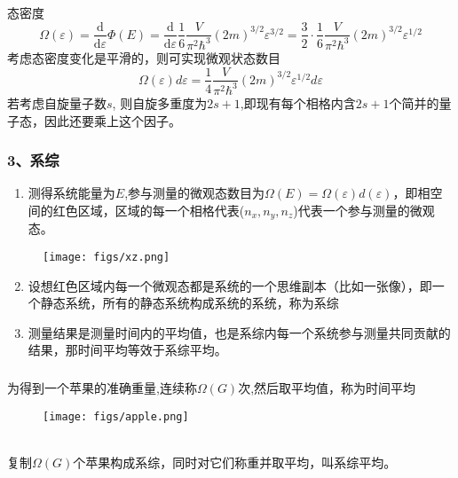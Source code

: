  \begin{frame}
   \frametitle{}
  态密度
  \[  \Omega(\varepsilon) =\frac{\mathrm{d}  }{\mathrm{d}\varepsilon}\Phi(E) = \frac{\mathrm{d}  }{\mathrm{d}\varepsilon} \frac{1}{6} \frac{V}{\pi ^2 \hbar^3} (2m)^{3/2} \varepsilon^{3/2} = \frac{3}{2}\cdot\frac{1}{6} \frac{V}{\pi ^2 \hbar^3} (2m)^{3/2} \varepsilon^{1/2} \]
  考虑态密度变化是平滑的，则可实现微观状态数目
  \[\Omega(\varepsilon)  d \varepsilon = \frac{1}{4} \frac{V}{\pi ^2 \hbar^3} (2m)^{3/2} \varepsilon^{1/2} d \varepsilon \]
  若考虑自旋量子数$s$, 则自旋多重度为$2s+1$,即现有每个相格内含$2s+1$个简并的量子态，因此还要乘上这个因子。
 \end{frame} 

 \begin{frame}
   \frametitle{ 3、系综}

   \begin{minipage}[b]{0.49\textwidth}
    \begin{enumerate}
      \item 测得系统能量为$E$,参与测量的微观态数目为$\Omega(E) = \Omega(\varepsilon) d (\varepsilon) $，即相空间的红色区域，区域的每一个相格代表($n_x, n_y, n_z$)代表一个参与测量的微观态。
    \end{enumerate}
    \end{minipage}
    \begin{minipage}[b]{0.49\textwidth}
      \begin{figure}[htbp]
        \centering
        \texttt{[image: figs/xz.png]}
       \end{figure}
      \end{minipage}
      \begin{enumerate}
        \setcounter{enumi}{1}
        \item 设想红色区域内每一个微观态都是系统的一个思维副本（比如一张像），即一个静态系统，所有的静态系统构成系统的系统，称为系综 
        \item 测量结果是测量时间内的平均值，也是系综内每一个系统参与测量共同贡献的结果，那时间平均等效于系综平均。
      \end{enumerate}
 \end{frame} 

\begin{frame}
  \frametitle{}
为得到一个苹果的准确重量,连续称$\Omega(G)$次,然后取平均值，称为时间平均\\
\begin{figure}[htbp]
  \centering
  \texttt{[image: figs/apple.png]}
\end{figure}
~~\\ 
复制$\Omega(G)$个苹果构成系综，同时对它们称重并取平均，叫系综平均。\\
\end{frame} 

